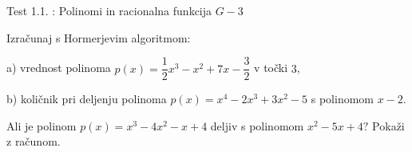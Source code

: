 \documentclass[a4paper,12pt]{letter}
\renewcommand{\headrulewidth}{3pt}
\renewcommand{\headrulewidth}{0.3pt}
\newcounter{tocke}
\begin{document}
\pagestyle{fancy}
\renewcommand\headrulewidth{0pt}
\lhead{}\chead{}\rhead{}
\rfoot{\vspace*{-2\baselineskip}}


\renewcommand{\vec}{\overrightarrow}


\everymath{\displaystyle}
\begin{minipage}{20cm}
\begin{bclogo}[couleur=brown!40,
  arrondi=0,ombre=true, couleurOmbre=gray!50,
logo =\bcplume,
  noborder=true]
{\textrm{{\Large{Test 1.1.} \Huge{}:
%
%
\large{Polinomi in racionalna funkcija} \hfill $G-3$}}}
\end{bclogo}
\end{minipage}
\begin{minipage}{20cm}
\end{minipage}


\def\tocke2{3+3}
\begin{naloga}[\hfill \quad $\tocke2$
\qquad \rightsquigarrow \vert a.\qquad|] \addtocounter{tocke}{\tocke2}

Izračunaj s Hormerjevim algoritmom:

a) vrednost polinoma $p(x)= \dfrac{1}{2}x^3-x^2+7x-\dfrac{3}{2}$ v točki $3$,

b) količnik pri deljenju polinoma $p(x)=x^4-2x^3+3x^2-5$ s polinomom $x-2$.
\end{naloga}





\newpage
\def\tocke18{6}
\begin{naloga}[\hfill \quad $\tocke18$
\qquad \rightsquigarrow \vert a.\qquad\vert b.\qquad|
c.\qquad|] \addtocounter{tocke}{\tocke18}

Ali je polinom $p(x)=x^3-4x^2-x+4$ deljiv s polinomom $x^2-5x+4?$
Pokaži z računom.
\end{naloga}
\end{document}
